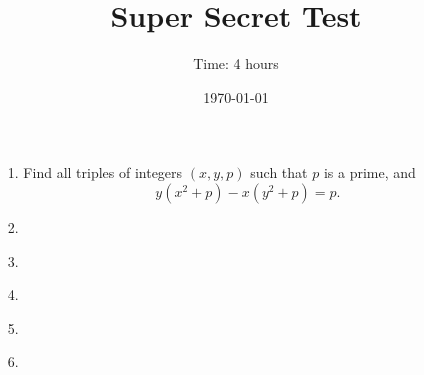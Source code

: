 \documentclass{article}
\title{Super Secret Test} %
\author{Time: 4 hours}
\date{\today} %
\begin{document}
 \maketitle
\begin{enumerate}

\item[1.] %
	Find all triples of integers $(x, y, p)$ such that $p$ is a prime, and
	\[
			y(x^2 + p) - x(y^2 + p) = p.
	\]

\item[2.]


\item[3.]


\item[4.]


\item[5.]


\item[6.]


\end{enumerate}
\end{document}
